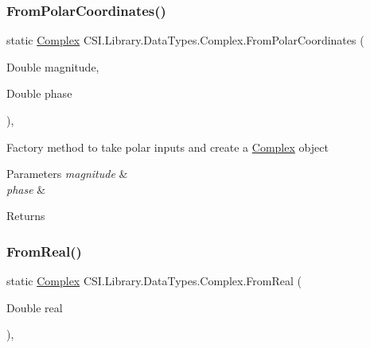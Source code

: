 \subsubsection{\texorpdfstring{FromPolarCoordinates()}{FromPolarCoordinates()}}
{\footnotesize\ttfamily static \mbox{\hyperlink{struct_c_s_i_1_1_library_1_1_data_types_1_1_complex}{Complex}} C\+S\+I.\+Library.\+Data\+Types.\+Complex.\+From\+Polar\+Coordinates (\begin{DoxyParamCaption}\item[{Double}]{magnitude,  }\item[{Double}]{phase }\end{DoxyParamCaption})\hspace{0.3cm}{\ttfamily [inline]}, {\ttfamily [static]}}



Factory method to take polar inputs and create a \mbox{\hyperlink{struct_c_s_i_1_1_library_1_1_data_types_1_1_complex}{Complex}} object 


\begin{DoxyParams}{Parameters}
{\em magnitude} & \\
\hline
{\em phase} & \\
\hline
\end{DoxyParams}
\begin{DoxyReturn}{Returns}

\end{DoxyReturn}
\mbox{\label{struct_c_s_i_1_1_library_1_1_data_types_1_1_complex_a78c4b457ae3aae0ca55c4df4ea2b09f3}} 
\subsubsection{\texorpdfstring{FromReal()}{FromReal()}}
{\footnotesize\ttfamily static \mbox{\hyperlink{struct_c_s_i_1_1_library_1_1_data_types_1_1_complex}{Complex}} C\+S\+I.\+Library.\+Data\+Types.\+Complex.\+From\+Real (\begin{DoxyParamCaption}\item[{Double}]{real }\end{DoxyParamCaption})\hspace{0.3cm}{\ttfamily [inline]}, {\ttfamily [static]}}



